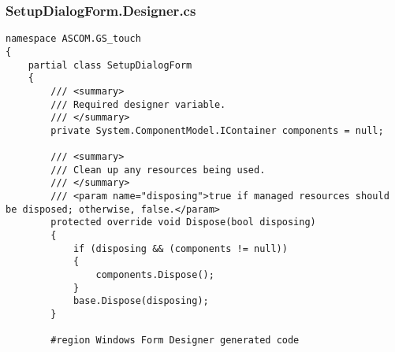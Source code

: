 \subsubsection{SetupDialogForm.Designer.cs}
\begin{lstlisting}
namespace ASCOM.GS_touch
{
	partial class SetupDialogForm
	{
		/// <summary>
		/// Required designer variable.
		/// </summary>
		private System.ComponentModel.IContainer components = null;
		
		/// <summary>
		/// Clean up any resources being used.
		/// </summary>
		/// <param name="disposing">true if managed resources should be disposed; otherwise, false.</param>
		protected override void Dispose(bool disposing)
		{
			if (disposing && (components != null))
			{
				components.Dispose();
			}
			base.Dispose(disposing);
		}
		
		#region Windows Form Designer generated code
		

\end{lstlisting}
